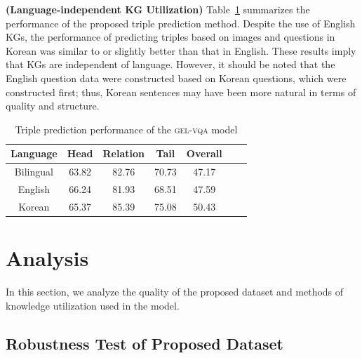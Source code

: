 \documentclass[letterpaper]{article} %
\begin{document}
\noindent \textbf{(Language-independent KG Utilization)} Table~\ref{tab:table2} summarizes the performance of the proposed triple prediction method. Despite the use of English KGs, the performance of predicting triples based on images and questions in Korean was similar to or slightly better than that in English. These results imply that KGs are independent of language. However, it should be noted that the English question data were constructed based on Korean questions, which were constructed first; thus, Korean sentences may have been more natural in terms of quality and structure.

\begin{table}[t]
\centering
\small
\begin{tabular}{ccccccc}
\toprule
Language      & Head            & Relation              & Tail                & Overall     \\
\midrule
Bilingual     &63.82            &82.76                  & 70.73               & 47.17       \\
English       &66.24            &81.93                  & 68.51               & 47.59       \\
Korean        &65.37            &85.39                  & 75.08               & 50.43       \\

\bottomrule
\end{tabular}
\caption{Triple prediction performance of the \textsc{gel-vqa} model}
\label{tab:table2}
\end{table}
\section{Analysis}

In this section, we analyze the quality of the proposed dataset and methods of knowledge utilization used in the model.

\subsection{Robustness Test of Proposed Dataset}
\end{document}
